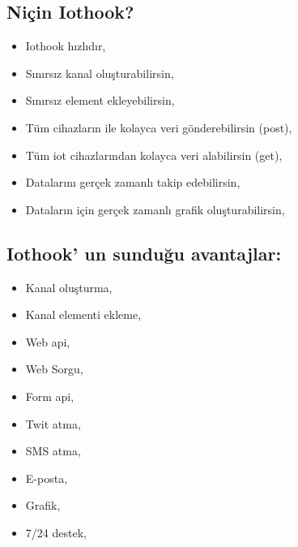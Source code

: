 \documentclass[letterpaper,10pt,turkish]{sphinxmanual}
\begin{document}
\subsection{Niçin Iothook?}
\label{\detokenize{what-is-iot:nicin-iothook}}\begin{itemize}
\item {} 
Iothook hızlıdır,

\item {} 
Sınırsız kanal oluşturabilirsin,

\item {} 
Sınırsız element ekleyebilirsin,

\item {} 
Tüm cihazların ile kolayca veri gönderebilirsin (post),

\item {} 
Tüm iot cihazlarından kolayca veri alabilirsin (get),

\item {} 
Datalarını gerçek zamanlı takip edebilirsin,

\item {} 
Dataların için gerçek zamanlı grafik oluşturabilirsin,

\end{itemize}


\subsection{Iothook’ un sunduğu avantajlar:}
\label{\detokenize{what-is-iot:iothook-un-sundugu-avantajlar}}\begin{itemize}
\item {} 
Kanal oluşturma,

\item {} 
Kanal elementi ekleme,

\item {} 
Web api,

\item {} 
Web Sorgu,

\item {} 
Form api,

\item {} 
Twit atma,

\item {} 
SMS atma,

\item {} 
E-posta,

\item {} 
Grafik,

\item {} 
7/24 destek,

\end{itemize}
\end{document}
